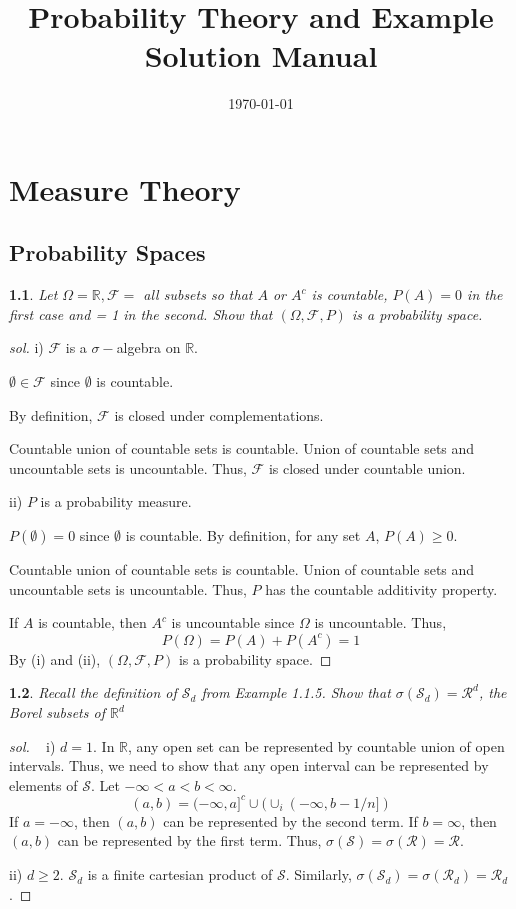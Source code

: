 \documentclass{report}
\newtheorem{ex}{}[section]
\newcommand\frontmatter{%
    \clearpage
  \pagenumbering{roman}}
\newcommand\mainmatter{%
    \clearpage
  \pagenumbering{arabic}}
\begin{document}
\title{Probability Theory and Example Solution Manual}
\author{}
\date{\today}
\frontmatter
\maketitle


\tableofcontents
\mainmatter

\chapter{Measure Theory}
\section{Probability Spaces}
\begin{ex}
Let $\Omega = \mathbb{R}, \mathcal{F} =$ all subsets so that $A$ or $A^c$ is countable, $P(A) = 0$ in the first case and = 1 in the second. Show that $(\Omega, \mathcal{F}, P)$ is a probability space.
\end{ex}
\begin{proof}[sol]
i) $\mathcal{F}$ is a $\sigma-$algebra on $\mathbb{R}$.

$\emptyset \in \mathcal{F}$ since $\emptyset$ is countable.

By definition, $\mathcal{F}$ is closed under complementations.

Countable union of countable sets is countable.  Union of countable sets and uncountable sets is uncountable. Thus, $\mathcal{F}$ is closed under countable union. 

ii) $P$ is a probability measure.

$P(\emptyset) = 0$ since $\emptyset$ is countable. By definition, for any set $A$, $P(A) \ge 0$.

Countable union of countable sets is countable.  Union of countable sets and uncountable sets is uncountable. Thus, $P$ has the countable additivity property. 

If $A$ is countable, then $A^c$ is uncountable since $\Omega$ is uncountable. Thus,
\[P(\Omega) = P(A) + P(A^c) = 1\]
By (i) and (ii), $(\Omega, \mathcal{F}, P)$ is a probability space.
\end{proof}
\begin{ex}
Recall the definition of $\mathcal{S}_d$ from Example 1.1.5. Show that $\sigma (\mathcal{S}_d) =\mathcal{R}^d$, the Borel subsets of $\mathbb{R}^d$
\end{ex}
\begin{proof}[sol]~
i) $d = 1$. In $\mathbb{R}$, any open set can be represented by countable union of open intervals. Thus, we need to show that any open interval can be represented by elements of $\mathcal{S}$. Let $-\infty < a <  b < \infty$.
\[(a,b) = (-\infty, a]^c \cup (\cup_i(-\infty, b - 1/n])\]
If $a = -\infty$, then $(a,b)$ can be represented by the second term. If $b =  \infty$, then $(a,b)$ can be represented by the first term. Thus, $\sigma(\mathcal{S}) = \sigma(\mathcal{R}) = \mathcal{R}$.

ii) $d \ge 2$. $\mathcal{S}_d$ is a finite cartesian product of $\mathcal{S}$. Similarly, $\sigma(\mathcal{S}_d) = \sigma(\mathcal{R}_d) = \mathcal{R}_d$.
\end{proof}
\end{document}
